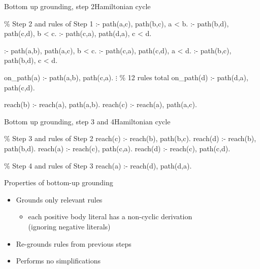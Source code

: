 \begin{frame}{Bottom up grounding, step 2}{Hamiltonian cycle}
\begin{SemiVerbatim}[\small]{.9}
{\color{comment}\% Step 2 \alert{and} rules of Step 1}
:- \alert{path(a,c)}, \alert{path(b,c)}, a < b.
:- \alert{path(b,d)}, \alert{path(c,d)}, b < c.
:- \alert{path(c,a)}, \alert{path(d,a)}, c < d.

:- \alert{path(a,b)}, \alert{path(a,c)}, b < c.
:- \alert{path(c,a)}, \alert{path(c,d)}, a < d.
:- \alert{path(b,c)}, \alert{path(b,d)}, c < d.

on_path(a) :- \alert{path(a,b)}, \alert{path(c,a)}.
           \(\vdots\) {\color{comment}\% 12 rules total}
on_path(d) :- \alert{path(d,a)}, \alert{path(c,d)}.

reach(b) :- \alert{reach(a)}, \alert{path(a,b)}.
reach(c) :- \alert{reach(a)}, \alert{path(a,c)}.
\end{SemiVerbatim}
\end{frame}
\begin{frame}{Bottom up grounding, step 3 and 4}{Hamiltonian cycle}
  \bigskip
\begin{SemiVerbatim}{.9}
{\color{comment}\% Step 3 \alert{and} rules of Step 2}
reach(c) :- \alert{reach(b)}, path(b,c).
reach(d) :- \alert{reach(b)}, path(b,d).
reach(a) :- \alert{reach(c)}, path(c,a).
reach(d) :- \alert{reach(c)}, path(c,d).

{\color{comment}\% Step 4 \alert{and} rules of Step 3}
reach(a) :- \alert{reach(d)}, path(d,a).
\end{SemiVerbatim}
\end{frame}
\begin{frame}{Properties of bottom-up grounding}
  \bigskip
  \begin{itemize}
  \item Grounds only \alert{relevant} rules
    \begin{itemize}\normalsize
    \item each positive body literal has a non-cyclic derivation \\
      (ignoring negative literals)
    \end{itemize}
    \smallskip
  \item \alert{Re-grounds} rules from previous steps


  \medskip
  \item Performs no \alert{simplifications}
  \end{itemize}
\end{frame}
